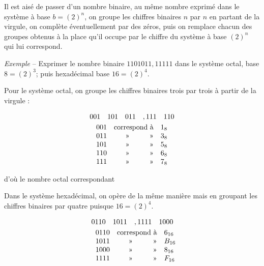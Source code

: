 \bigskip 

Il est aisé de  passer d'un nombre binaire, au même nombre exprimé dans le système
à base $b=(2)^{n}$, on groupe les chiffres binaires $n$ par $n$
en partant de la virgule, on complète éventuellement par des zéros,  puis on remplace chacun des groupes obtenus
à la place qu'il occupe par le chiffre du système à base $(2)^{n}$ qui lui correspond.

\newpage 

\textsl{Exemple} -- Exprimer le nombre binaire $1101011,11111$ dans le système octal, base $8=(2)^3$; puis hexadécimal base $16=(2)^4$. 

Pour le système octal, on groupe les chiffres binaires trois par trois à partir de la virgule :

\[ \begin{array}{@{\hspace*{5mm}}ccl} 
\multicolumn{3}{c}{001 \quad 101 \quad 011 \quad , 111 \quad  110} \\[1mm]
001 & \text{correspond à}  & 1_{8} \\ 
011 & \multicolumn{1}{r}{\text{»\hspace*{1cm}»}}  & 3_{8} \\ 
101 & \multicolumn{1}{r}{\text{»\hspace*{1cm}»}}  & 5_{8} \\ 
110 & \multicolumn{1}{r}{\text{»\hspace*{1cm}»}}  & 6_{8} \\ 
111 & \multicolumn{1}{r}{\text{»\hspace*{1cm}»}}  & 7_{8} \\ 
\end{array} 
\]

d'où le nombre octal correspondant  

Dans le système hexadécimal, on opère de la même manière mais en groupant les chiffres binaires par quatre puisque $16=(2)^4$.

\[ \begin{array}{@{\hspace*{5mm}}ccl} 
\multicolumn{3}{c}{0110 \quad 1011 \quad  , 1111 \quad  1000} \\[1mm]
0110 & \text{correspond à}  & 6_{16} \\ 
1011 & \multicolumn{1}{r}{\text{»\hspace*{1cm}»}}  & B_{16} \\ 
1000 & \multicolumn{1}{r}{\text{»\hspace*{1cm}»}}  & 8_{16} \\ 
1111& \multicolumn{1}{r}{\text{»\hspace*{1cm}»}}  & F_{16} \\ 
\end{array} 
\]

